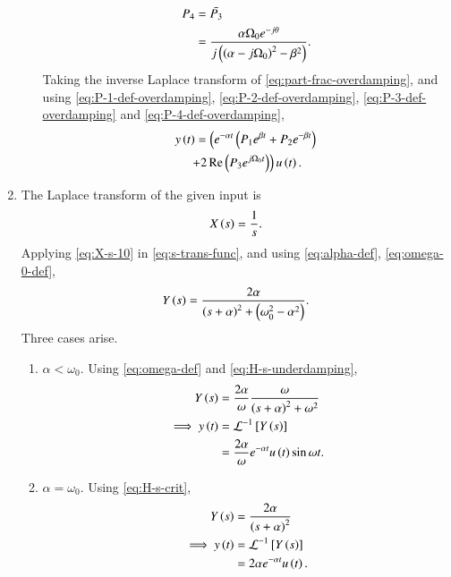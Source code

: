 \documentclass[journal,12pt,twocolumn]{IEEEtran}
\begin{document}
\begin{enumerate}[label=\theenumi.]
\begin{enumerate}
        \begin{align}
            P_4 &= \bar{P_3} \\
                &= \frac{\alpha\Omega_0e^{-j\theta}}{j\left(\left(\alpha-j\Omega_0\right)^2-\beta^2\right)}.
            \label{eq:P-4-def-overdamping}
        \end{align}
        Taking the inverse Laplace transform of \eqref{eq:part-frac-overdamping},
        and using \eqref{eq:P-1-def-overdamping}, \eqref{eq:P-2-def-overdamping},
        \eqref{eq:P-3-def-overdamping} and \eqref{eq:P-4-def-overdamping},
        \begin{multline}
            y\left(t\right) = \left(e^{-\alpha{}t}\left(P_1e^{\beta{}t} + P_2e^{-\beta{}t}\right)\right. \\
            \left.+ 2\mathop{\mathrm{Re}}\left(P_3e^{j\Omega_0t}\right)\right)u\left(t\right).
            \label{eq:y-t-overdamping}
        \end{multline}
    \end{enumerate}

    \item The Laplace transform of the given input is
    \begin{equation}
        X\left(s\right) = \frac{1}{s}.
        \label{eq:X-s-10}
    \end{equation}
    Applying \eqref{eq:X-s-10} in \eqref{eq:s-trans-func}, and using
    \eqref{eq:alpha-def}, \eqref{eq:omega-0-def},
    \begin{equation}
        Y\left(s\right) = \frac{2\alpha}{\left(s+\alpha\right)^2 + \left(\omega_0^2-\alpha^2\right)}.
        \label{Y-s-10}
    \end{equation}
    Three cases arise.
    \begin{enumerate}
        \item \(\alpha < \omega_0\). Using \eqref{eq:omega-def} and
        \eqref{eq:H-s-underdamping},
        \begin{align}
            Y\left(s\right) &= \frac{2\alpha}{\omega}\frac{\omega}{\left(s+\alpha\right)^2+\omega^2} \\
            \implies y\left(t\right) &= \mathcal{L}^{-1}{}\left[Y\left(s\right)\right] \nonumber \\
            &= \frac{2\alpha}{\omega}e^{-\alpha{}t}u\left(t\right)\sin\omega{}t.
        \end{align}

        \item \(\alpha = \omega_0\). Using \eqref{eq:H-s-crit},
        \begin{align}
            Y\left(s\right) &= \frac{2\alpha}{\left(s+\alpha\right)^2} \\
            \implies y\left(t\right) &= \mathcal{L}^{-1}{}\left[Y\left(s\right)\right] \nonumber \\
            &= 2\alpha{}e^{-\alpha{}t}u\left(t\right).
        \end{align}


\end{enumerate}
\end{enumerate}
\end{document}
